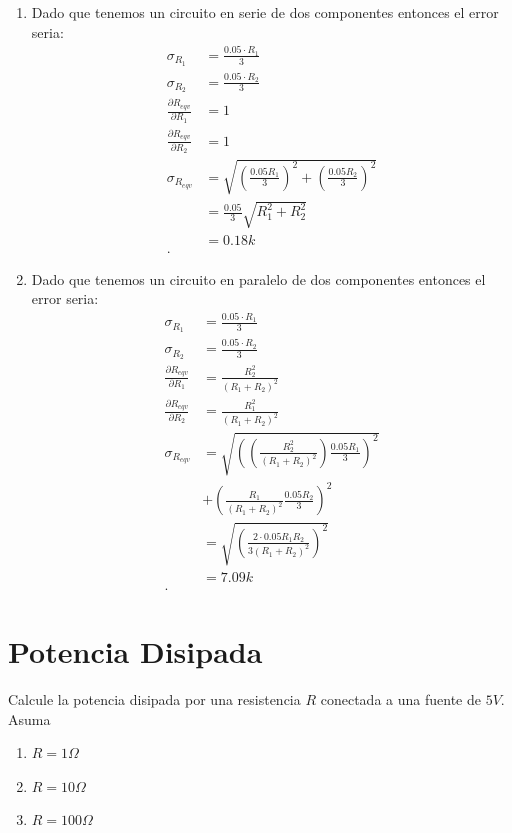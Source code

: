 \documentclass[a4paper, amsfonts, amssymb, amsmath, reprint, showkeys, nofootinbib, twoside]{revtex4-1}
\begin{document}
\begin{enumerate}
  \item Dado que tenemos un circuito en serie de dos componentes entonces el error seria:
    \begin{align*}
      \sigma_{R_1}&= \frac{0.05\cdot R_1}{3} \\
      \sigma_{R_2}&= \frac{0.05\cdot R_2}{3} \\
      \frac{\partial R_{eqv}}{\partial R_{1}} &= 1 \\
      \frac{\partial R_{eqv}}{\partial R_{2}} &= 1 \\
      \sigma_{R_{eqv}}&= \sqrt{\left( \frac{0.05R_1}{3} \right)^2 + \left( \frac{0.05 R_2}{3} \right)^2}  \\
      &= \frac{0.05}{3}\sqrt{R_1^2+R_2^2}  \\
      &= 0.18k \\
    .\end{align*}
  \item Dado que tenemos un circuito en paralelo de dos componentes entonces el error seria:
    \begin{align*}
      \sigma_{R_1}&= \frac{0.05\cdot R_1}{3} \\
      \sigma_{R_2}&= \frac{0.05\cdot R_2}{3} \\
      \frac{\partial R_{eqv}}{\partial R_{1}} &= \frac{R_2^2}{\left( R_1+R_2 \right)^2}	 \\
      \frac{\partial R_{eqv}}{\partial R_{2}} &= \frac{R_1^2}{\left( R_1+R_2 \right)^2} \\
      \sigma_{R_{eqv}}&= \sqrt{\left( \left( \frac{R_2^2}{\left( R_1+R_2 \right)^2} \right) \frac{0.05R_1}{3} \right)^2}\\
      &+\left( \frac{R_1}{\left( R_1+R_2 \right)^2}\frac{0.05R_2}{3} \right)^2  \\
      &= \sqrt{\left( \frac{2\cdot 0.05R_1R_2}{3\left( R_1+R_2 \right)^2} \right)^2}  \\ 
      &= 7.09k \\
    .\end{align*}
\end{enumerate}

\section{Potencia Disipada}

Calcule la potencia disipada por una resistencia $R$ conectada a una fuente de $5V$. Asuma
\begin{enumerate}
  \item $R=1\Omega$ 
  \item $R=10\Omega$ 
  \item $R=100\Omega$ 
\end{enumerate}
\end{document}
